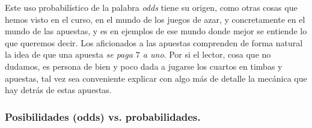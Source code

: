 Este uso probabilístico de la palabra {\em odds} tiene su origen, como otras cosas que hemos visto en el curso, en el mundo de los juegos de azar, y concretamente en el mundo de las apuestas, y es en ejemplos de ese mundo donde mejor se entiende lo que queremos decir. Los aficionados a las apuestas comprenden de forma natural la idea de que una apuesta {\em se paga $7$ a uno}. Por si el lector, cosa que no dudamos,  es persona de bien y poco dada a jugarse los cuartos en timbas y apuestas, tal vez sea conveniente explicar con algo más de detalle la mecánica que hay detrás de estas apuestas.

\subsubsection*{Posibilidades (odds) vs. probabilidades.}

